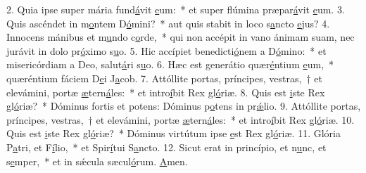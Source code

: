 2. Quia ipse super mária fund\uline{á}vit \uline{e}um:~* et super flúmina præpar\uline{á}vit \uline{e}um.
3. Quis ascéndet in m\uline{o}ntem D\uline{ó}mini?~* aut quis stabit in loco s\uline{a}ncto \uline{e}jus?
4. Innocens mánibus et m\uline{u}ndo c\uline{o}rde,~* qui non accépit in vano ánimam suam, nec jurávit in dolo pr\uline{ó}ximo s\uline{u}o.
5. Hic accípiet benedicti\uline{ó}nem a D\uline{ó}mino:~* et misericórdiam a Deo, salut\uline{á}ri s\uline{u}o.
6. Hæc est generátio quær\uline{é}ntium \uline{e}um,~* quæréntium fáciem D\uline{e}i J\uline{a}cob.
7. Attóllite portas, príncipes, vestras,~† et elevámini, portæ \uline{æ}tern\uline{á}les:~* et intro\uline{í}bit Rex gl\uline{ó}riæ.
8. Quis est \uline{i}ste Rex gl\uline{ó}riæ?~* Dóminus fortis et potens: Dóminus p\uline{o}tens in pr\uline{ǽ}lio.
9. Attóllite portas, príncipes, vestras,~† et elevámini, portæ \uline{æ}tern\uline{á}les:~* et intro\uline{í}bit Rex gl\uline{ó}riæ.
10. Quis est \uline{i}ste Rex gl\uline{ó}riæ?~* Dóminus virtútum ipse \uline{e}st Rex gl\uline{ó}riæ.
11. Glória P\uline{a}tri, et F\uline{í}lio,~* et Spir\uline{í}tui S\uline{a}ncto.
12. Sicut erat in princípio, et n\uline{u}nc, et s\uline{e}mper,~* et in sǽcula sæcul\uline{ó}rum. \uline{A}men.

